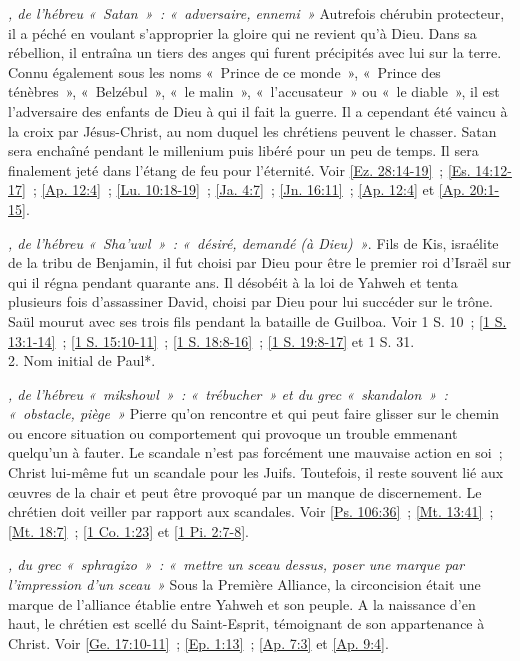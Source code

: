 \begin{multicols}{2}
\textit{, de l'hébreu «~Satan~»~: «~adversaire, ennemi~»}\newline
Autrefois chérubin protecteur, il a péché en voulant s'approprier la gloire qui ne revient qu'à Dieu. Dans sa rébellion, il entraîna un tiers des anges qui furent précipités avec lui sur la terre. Connu également sous les noms «~Prince de ce monde~», «~Prince des ténèbres~», «~Belzébul~», «~le malin~», «~l'accusateur~» ou «~le diable~», il est l'adversaire des enfants de Dieu à qui il fait la guerre. Il a cependant été vaincu à la croix par Jésus-Christ, au nom duquel les chrétiens peuvent le chasser. Satan sera enchaîné pendant le millenium puis libéré pour un peu de temps. Il sera finalement jeté dans l'étang de feu pour l'éternité. Voir \vref{Ez. 28:14-19}~; \vref{Es. 14:12-17}~; \vref{Ap. 12:4}~; \vref{Lu. 10:18-19}~; \vref{Ja. 4:7}~; \vref{Jn. 16:11}~; \vref{Ap. 12:4} et \vref{Ap. 20:1-15}.

\textit{, de l'hébreu «~Sha'uwl~»~: «~désiré, demandé (à Dieu)~»}. Fils de Kis, israélite de la tribu de Benjamin, il fut choisi par Dieu pour être le premier roi d'Israël sur qui il régna pendant quarante ans. Il désobéit à la loi de Yahweh et tenta plusieurs fois d'assassiner David, choisi par Dieu pour lui succéder sur le trône. Saül mourut avec ses trois fils pendant la bataille de Guilboa. Voir 1 S. 10~; \vref{1 S. 13:1-14}~; \vref{1 S. 15:10-11}~; \vref{1 S. 18:8-16}~; \vref{1 S. 19:8-17} et 1 S. 31.
\\2. Nom initial de Paul*.

\textit{, de l'hébreu «~mikshowl~»~: «~trébucher~» et du grec «~skandalon~»~: «~obstacle, piège~»}\newline
Pierre qu'on rencontre et qui peut faire glisser sur le chemin ou encore situation ou comportement qui provoque un trouble emmenant quelqu'un à fauter. Le scandale n'est pas forcément une mauvaise action en soi~; Christ lui-même fut un scandale pour les Juifs. Toutefois, il reste souvent lié aux œuvres de la chair et peut être provoqué par un manque de discernement. Le chrétien doit veiller par rapport aux scandales. Voir \vref{Ps. 106:36}~; \vref{Mt. 13:41}~; \vref{Mt. 18:7}~; \vref{1 Co. 1:23} et \vref{1 Pi. 2:7-8}.

\textit{, du grec «~sphragizo~»~: «~mettre un sceau dessus, poser une marque par l'impression d'un sceau~»}\newline
Sous la Première Alliance, la circoncision était une marque de l'alliance établie entre Yahweh et son peuple. A la naissance d'en haut, le chrétien est scellé du Saint-Esprit, témoignant de son appartenance à Christ. Voir \vref{Ge. 17:10-11}~; \vref{Ep. 1:13}~; \vref{Ap. 7:3} et \vref{Ap. 9:4}.


\end{multicols}
